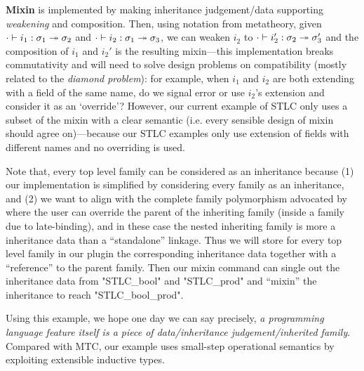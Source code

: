 \textbf{Mixin} is implemented by making inheritance judgement/data supporting \textit{weakening} and composition. Then, using notation from metatheory, given ${ {\cdot} \vdash {i_1} : {\sigma_1} \twoheadrightarrow {\sigma_2}}$ and ${ {\cdot} \vdash {i_2} : {\sigma_1} \twoheadrightarrow {\sigma_3}}$, we can weaken $i_2$ to ${ {\cdot} \vdash {i_2'} : {\sigma_2} \twoheadrightarrow {\sigma_3'}}$ and the composition of $i_1$ and $i_2'$ is the resulting mixin---this implementation breaks commutativity and will need to solve design problems on compatibility (mostly related to the \textit{diamond problem}): for example, when $i_1$ and $i_2$ are both extending with a field of the same name, do we signal error or use $i_2$'s extension and consider it as an `override'? However, our current example of STLC only uses a subset of the mixin with a clear semantic (i.e. every sensible design of mixin should agree on)---because our STLC examples only use extension of fields with different names and no overriding is used. 

Note that, every top level family can be considered as an inheritance because (1) our implementation is simplified by considering every family as an inheritance, and (2) we want to align with the complete family polymorphism advocated by \citet{zm2017} where the user can override the parent of the inheriting family (inside a family due to late-binding), and in these case the nested inheriting family is more a inheritance data than a ``standalone'' linkage. Thus we will store for every top level family in our plugin the corresponding inheritance data together with a ``reference'' to the parent family. Then our mixin command can single out the inheritance data from "STLC_bool" and "STLC_prod" and ``mixin'' the inheritance to reach "STLC_bool_prod". 

Using this example,
we hope one day we can say precisely, \textit{a programming language feature itself is a
piece of data/inheritance judgement/inherited family}. Compared with MTC,
our example uses small-step operational semantics by exploiting
extensible inductive types. 

